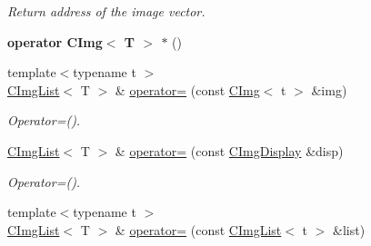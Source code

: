 \begin{DoxyCompactItemize}
\begin{DoxyCompactList}\small\item\em Return address of the image vector. \item\end{DoxyCompactList}\item 
\hypertarget{structcimg__library_1_1CImgList_a0f21983809954e8f7659305bdee019ea}{
{\bfseries operator CImg$<$ T $>$ $\ast$} ()}
\label{structcimg__library_1_1CImgList_a0f21983809954e8f7659305bdee019ea}

\item 
\hypertarget{structcimg__library_1_1CImgList_a76c8bdf651d88d36e2bb7a91e78e0aab}{
{\footnotesize template$<$typename t $>$ }\\\hyperlink{structcimg__library_1_1CImgList}{CImgList}$<$ T $>$ \& \hyperlink{structcimg__library_1_1CImgList_a76c8bdf651d88d36e2bb7a91e78e0aab}{operator=} (const \hyperlink{structcimg__library_1_1CImg}{CImg}$<$ t $>$ \&img)}
\label{structcimg__library_1_1CImgList_a76c8bdf651d88d36e2bb7a91e78e0aab}

\begin{DoxyCompactList}\small\item\em Operator=(). \item\end{DoxyCompactList}\item 
\hypertarget{structcimg__library_1_1CImgList_a1b5c6cf7b774f259c1ba321b6d14a82c}{
\hyperlink{structcimg__library_1_1CImgList}{CImgList}$<$ T $>$ \& \hyperlink{structcimg__library_1_1CImgList_a1b5c6cf7b774f259c1ba321b6d14a82c}{operator=} (const \hyperlink{structcimg__library_1_1CImgDisplay}{CImgDisplay} \&disp)}
\label{structcimg__library_1_1CImgList_a1b5c6cf7b774f259c1ba321b6d14a82c}

\begin{DoxyCompactList}\small\item\em Operator=(). \item\end{DoxyCompactList}\item 
\hypertarget{structcimg__library_1_1CImgList_ab541727426be2e3b20dc8350a4947530}{
{\footnotesize template$<$typename t $>$ }\\\hyperlink{structcimg__library_1_1CImgList}{CImgList}$<$ T $>$ \& \hyperlink{structcimg__library_1_1CImgList_ab541727426be2e3b20dc8350a4947530}{operator=} (const \hyperlink{structcimg__library_1_1CImgList}{CImgList}$<$ t $>$ \&list)}
\label{structcimg__library_1_1CImgList_ab541727426be2e3b20dc8350a4947530}


\end{DoxyCompactItemize}
